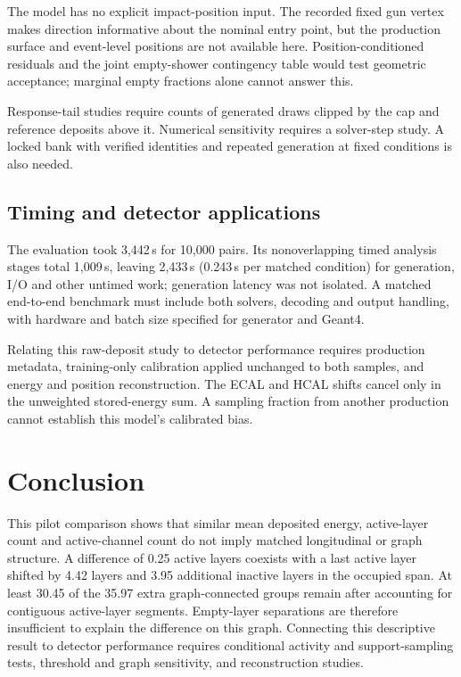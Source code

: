 \documentclass[10pt]{article}
\begin{document}
The model has no explicit impact-position input. The recorded fixed gun vertex makes direction informative about the nominal entry point, but the production surface and event-level positions are not available here. Position-conditioned residuals and the joint empty-shower contingency table would test geometric acceptance; marginal empty fractions alone cannot answer this.

Response-tail studies require counts of generated draws clipped by the cap and reference deposits above it. Numerical sensitivity requires a solver-step study. A locked bank with verified identities and repeated generation at fixed conditions is also needed.

\subsection{Timing and detector applications}

The evaluation took 3,442\,s for 10,000 pairs. Its nonoverlapping timed analysis stages total 1,009\,s, leaving 2,433\,s (0.243\,s per matched condition) for generation, I/O and other untimed work; generation latency was not isolated. A matched end-to-end benchmark must include both solvers, decoding and output handling, with hardware and batch size specified for generator and Geant4.

Relating this raw-deposit study to detector performance requires production metadata, training-only calibration applied unchanged to both samples, and energy and position reconstruction. The ECAL and HCAL shifts cancel only in the unweighted stored-energy sum. A sampling fraction from another production cannot establish this model's calibrated bias.

\section{Conclusion}

This pilot comparison shows that similar mean deposited energy, active-layer count and active-channel count do not imply matched longitudinal or graph structure. A difference of 0.25 active layers coexists with a last active layer shifted by 4.42 layers and 3.95 additional inactive layers in the occupied span. At least 30.45 of the 35.97 extra graph-connected groups remain after accounting for contiguous active-layer segments. Empty-layer separations are therefore insufficient to explain the difference on this graph. Connecting this descriptive result to detector performance requires conditional activity and support-sampling tests, threshold and graph sensitivity, and reconstruction studies.
\end{document}

